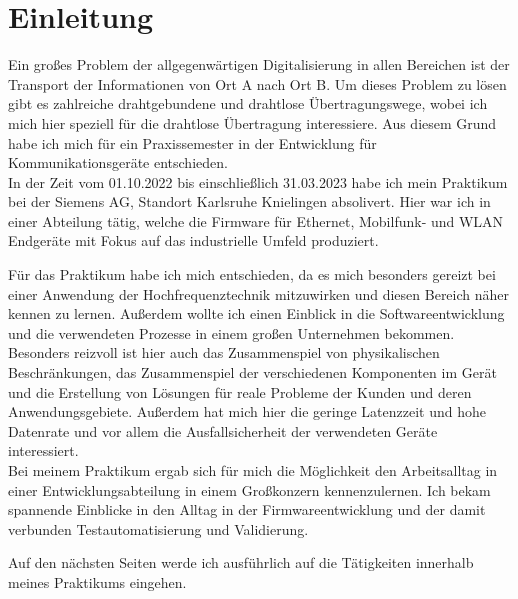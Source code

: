 \chapter{Einleitung}
Ein großes Problem der allgegenwärtigen Digitalisierung in allen Bereichen ist der Transport der Informationen von Ort A nach Ort B.
Um dieses Problem zu lösen gibt es zahlreiche drahtgebundene und drahtlose Übertragungswege, wobei ich mich hier speziell für die drahtlose Übertragung interessiere.
Aus diesem Grund habe ich mich für ein Praxissemester in der Entwicklung für Kommunikationsgeräte entschieden. \\

In der Zeit vom 01.10.2022 bis einschließlich 31.03.2023 habe ich mein Praktikum bei der Siemens AG, Standort Karlsruhe Knielingen absolivert.
Hier war ich in einer Abteilung tätig, welche die Firmware für Ethernet, Mobilfunk- und WLAN Endgeräte mit Fokus auf das industrielle Umfeld produziert. 

Für das Praktikum habe ich mich entschieden, da es mich besonders gereizt bei einer Anwendung der Hochfrequenztechnik mitzuwirken und diesen Bereich näher kennen zu lernen.
Außerdem wollte ich einen Einblick in die Softwareentwicklung und die verwendeten Prozesse in einem großen Unternehmen bekommen. 
Besonders reizvoll ist hier auch das Zusammenspiel von physikalischen Beschränkungen, das Zusammenspiel der verschiedenen Komponenten im Gerät und die Erstellung von Lösungen für reale Probleme der Kunden und deren Anwendungsgebiete.
Außerdem hat mich hier die geringe Latenzzeit und hohe Datenrate und vor allem die Ausfallsicherheit der verwendeten Geräte interessiert. \\

Bei meinem Praktikum ergab sich für mich die Möglichkeit den Arbeitsalltag in einer Entwicklungsabteilung in einem Großkonzern kennenzulernen. Ich bekam spannende Einblicke in den Alltag in der Firmwareentwicklung und der damit verbunden Testautomatisierung und Validierung.


Auf den nächsten Seiten werde ich ausführlich auf die Tätigkeiten innerhalb meines Praktikums eingehen.